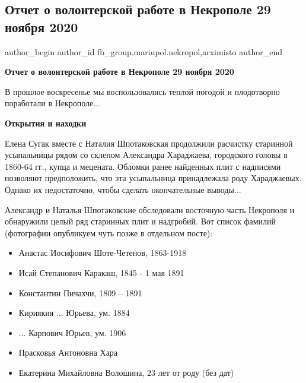  
 
 
 
 

\subsection{Отчет о волонтерской работе в Некрополе 29 ноября 2020}
\label{sec:02_12_2020.fb.fb_group.mariupol.nekropol.1.otchet_volonter_rabota_29_nojabrja_2020}
 
\ifcmt
 author_begin
   author_id fb_group.mariupol.nekropol,arximisto
 author_end
\fi

\textbf{Отчет о волонтерской работе в Некрополе 29 ноября 2020}

В прошлое воскресенье мы воспользовались теплой погодой и плодотворно поработали в Некрополе...

\textbf{Открытия и находки}

Елена Сугак вместе с Наталия Шпотаковская продолжили расчистку старинной
усыпальницы рядом со склепом Александра Хараджаева, городского головы в 1860-64
гг., купца и мецената. Обломки ранее найденных плит с надписями позволяют
предположить, что эта усыпальница принадлежала роду Хараджаевых. Однако их
недостаточно, чтобы сделать окончательные выводы...

Александр и Наталья Шпотаковские обследовали восточную часть Некрополя и
обнаружили целый ряд старинных плит и надгробий. Вот список фамилий (фотографии
опубликуем чуть позже в отдельном посте):

\begin{itemize}
	\item Анастас Иосифович Шоте-Четенов, 1863-1918
	\item Исай Степанович Каракаш, 1845 - 1 мая 1891
	\item Константин Пичахчи, 1809 – 1891
	\item Кириякия ... Юрьева, ум. 1884
	\item ... Карпович Юрьев, ум. 1906
	\item Прасковья Антоновна Хара
	\item Екатерина Михайловна Волошина, 23 лет от роду (без дат)
\end{itemize}

